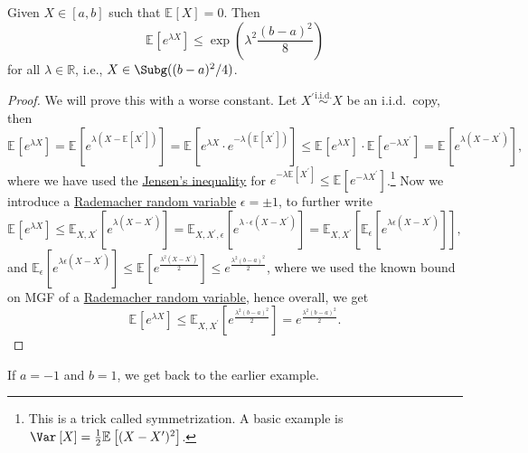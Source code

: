 \begin{lemma}\label{lma:bounded-rv-is-sub-gaussian}
  Given \(X\in [a, b]\) such that \(\mathbb{E}_{}\left[X \right] = 0\). Then
  \[
    \mathbb{E}_{}\left[e^{\lambda X} \right] \leq \exp (\lambda ^2 \frac{(b-a)^2}{8})
  \]
  for all \(\lambda \in \mathbb{R} \), i.e., \(X\in \Subg((b-a)^2 / 4) \).
\end{lemma}
\begin{proof}
  We will prove this with a worse constant. Let \(X^{\prime} \overset{\text{i.i.d.} }{\sim } X\) be an i.i.d.\ copy, then
  \[
    \mathbb{E}_{}\left[e^{\lambda X} \right]
    = \mathbb{E}_{}\left[e^{\lambda (X - \mathbb{E}_{}\left[X^{\prime}  \right] )} \right]
    = \mathbb{E}_{}\left[e^{\lambda X}\cdot e^{-\lambda (\mathbb{E}_{}\left[X^{\prime}  \right] )} \right]
    \leq \mathbb{E}_{}\left[e^{\lambda X} \right] \cdot \mathbb{E}_{}\left[e^{-\lambda X^{\prime} } \right]
    = \mathbb{E}_{}\left[e^{\lambda (X - X^{\prime} )} \right],
  \]
  where we have used the \href{https://en.wikipedia.org/wiki/Jensen%27s_inequality}{Jensen's inequality} for \(e^{-\lambda \mathbb{E}_{}\left[X^{\prime}  \right] } \leq \mathbb{E}_{}\left[e^{-\lambda X^{\prime} } \right] \).\footnote{This is a trick called symmetrization. A basic example is \(\Var_{}\left[X \right] = \frac{1}{2} \mathbb{E}_{}\left[(X - X^{\prime} )^2 \right] \).} Now we introduce a \hyperref[eg:Rademacher-random-varaible]{Rademacher random variable} \(\epsilon = \pm 1\), to further write
  \[
    \mathbb{E}_{}\left[e^{\lambda X} \right]
    \leq \mathbb{E}_{X, X^{\prime} }\left[e^{\lambda (X - X^{\prime} )} \right]
    = \mathbb{E}_{X, X^{\prime} , \epsilon }\left[ e^{\lambda \cdot \epsilon (X - X^{\prime} )} \right]
    = \mathbb{E}_{X, X^{\prime} }\left[ \mathbb{E}_{\epsilon }\left[e^{\lambda \epsilon (X - X^{\prime} )} \right]  \right] ,
  \]
  and \(\mathbb{E}_{\epsilon }\left[ e^{\lambda \epsilon (X - X^{\prime} )} \right] \leq \mathbb{E}_{}\left[e^{\frac{\lambda ^2(X - X^{\prime} )}{2}} \right] \leq e^{\frac{\lambda ^2(b - a)^2}{2}} \), where we used the known bound on MGF of a \hyperref[eg:Rademacher-random-varaible]{Rademacher random variable}, hence overall, we get
  \[
    \mathbb{E}_{}\left[e^{\lambda X} \right] \leq \mathbb{E}_{X, X^{\prime} }\left[e^{\frac{\lambda ^2(b-a)^2}{2}} \right] = e^{\frac{\lambda ^2(b-a)^2}{2}}.
  \]
\end{proof}

\begin{note}
  If \(a = -1\) and \(b = 1\), we get back to the earlier example.
\end{note}

